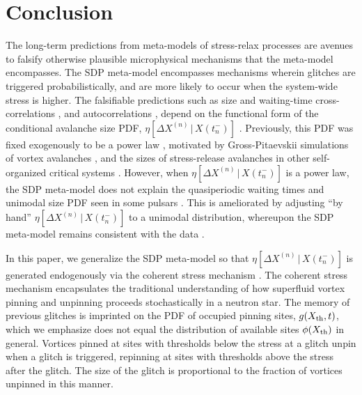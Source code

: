 \section{Conclusion} \label{sec:hda_concl}
The long-term predictions from meta-models of stress-relax processes are avenues to falsify otherwise plausible microphysical mechanisms that the meta-model encompasses. The SDP meta-model \citep{Fulgenzi2017} encompasses mechanisms wherein glitches are triggered probabilistically, and are more likely to occur when the system-wide stress is higher. The falsifiable predictions such as size and waiting-time cross-correlations \citep{Melatos2018}, and autocorrelations \citep{Carlin2019ac}, depend on the functional form of the conditional avalanche size PDF, $\eta[\Delta X^{(n)}\,|\,X(t_{n}^-)]$ \citep{Carlin2019quasi}. Previously, this PDF was fixed exogenously to be a power law \citep{Fulgenzi2017, Melatos2018, Melatos2019}, motivated by Gross-Pitaevskii simulations of vortex avalanches \citep{Warszawski2011}, and the sizes of stress-release avalanches in other self-organized critical systems \citep{Jensen1998}. However, when $\eta[\Delta X^{(n)}\,|\,X(t_{n}^-)]$ is a power law, the SDP meta-model does not explain the quasiperiodic waiting times and unimodal size PDF seen in some pulsars \citep{Howitt2018}. This is ameliorated by adjusting ``by hand'' $\eta[\Delta X^{(n)}\,|\,X(t_{n}^-)]$ to a unimodal distribution, whereupon the SDP meta-model remains consistent with the data \citep{Carlin2019quasi}.  

In this paper, we generalize the SDP meta-model so that $\eta[\Delta X^{(n)}\,|\,X(t_{n}^-)]$ is generated endogenously via the coherent stress mechanism \citep{Sneppen1997, Melatos2009}. The coherent stress mechanism encapsulates the traditional understanding of how superfluid vortex pinning and unpinning proceeds stochastically in a neutron star. The memory of previous glitches is imprinted on the PDF of occupied pinning sites, $g(X_{\rm th}, t)$, which we emphasize does not equal the distribution of available sites $\phi(X_{\rm th})$ in general. Vortices pinned at sites with thresholds below the stress at a glitch unpin when a glitch is triggered, repinning at sites with thresholds above the stress after the glitch. The size of the glitch is proportional to the fraction of vortices unpinned in this manner. 


